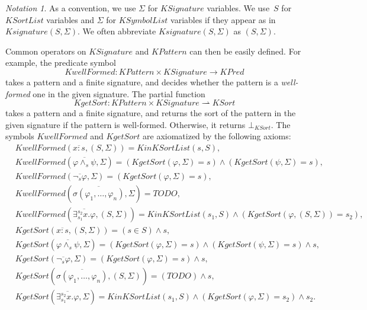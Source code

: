 \documentclass[UTF8,11pt]{article}
\newcounter{thmcounter}
\theoremstyle{plain}
\theoremstyle{definition}
\theoremstyle{remark}
\newtheorem{notation}   [thmcounter]{Notation}
\newcommand{\cln}{{:}}
\newcommand{\KPred}{\mathit{KPred}}
\newcommand{\KSort}{\mathit{KSort}}
\newcommand{\KSortList}{\mathit{KSortList}}
\newcommand{\KinKSortList}{\mathit{KinKSortList}}
\newcommand{\KSymbolList}{\mathit{KSymbolList}}
\newcommand{\KPattern}{\mathit{KPattern}}
\newcommand{\KSignature}{\mathit{KSignature}}
\newcommand{\Ksignature}{\mathit{Ksignature}}
\newcommand{\KwellFormed}{\mathit{KwellFormed}}
\newcommand{\KgetSort}{\mathit{KgetSort}}
\begin{document}
\begin{notation}
	As a convention, we use $\Sigma$ for $\KSignature$ variables. 
	We use~$S$ for~$\KSortList$ variables and $\Sigma$ for $\KSymbolList$ variables if they appear as in~$\Ksignature(S, \Sigma)$.
	We often abbreviate $\Ksignature(S, \Sigma)$ as $( S, \Sigma )$. 
\end{notation}

Common operators on $\KSignature$ and $\KPattern$ can then be easily defined.
For example, the predicate symbol 
$$\KwellFormed \colon \KPattern \times \KSignature \to \KPred$$ 
takes a pattern and a finite signature, and decides whether the pattern is a \emph{well-formed} one in the given signature.
The partial function
$$\KgetSort \colon \KPattern \times \KSignature \rightharpoonup \KSort$$
takes a pattern and a finite signature, and returns the sort of the pattern in the given signature if the pattern is well-formed.
Otherwise, it returns $\bot_\KSort$.
The symbols $\KwellFormed$ and $\KgetSort$ are axiomatized by the following axioms:
\begin{align*}
  &\KwellFormed(\overline{x \cln s}, ( S, \Sigma )) = \KinKSortList(s, S),
  \\
  & \KwellFormed(\overline{\varphi \wedge_s \psi}, \Sigma) = (\KgetSort(\varphi, \Sigma) = s) \wedge (\KgetSort(\psi, \Sigma) = s),
  \\
  & \KwellFormed(\overline{\neg_s \varphi}, \Sigma) = (\KgetSort(\varphi, \Sigma) = s),
  \\
  & \KwellFormed(\overline{\sigma(\varphi_1, \dots, \varphi_n)}, \Sigma) = TODO,
  \\
  & \KwellFormed(\overline{\exists_{s_1}^{s_2} x . \varphi}, ( S, \Sigma )) = \KinKSortList(s_1, S) \wedge (\KgetSort(\varphi, (S, \Sigma)) = s_2),
  \\
  & \KgetSort(\overline{x \cln s}, ( S, \Sigma )) = (s \in S) \wedge s,
  \\
  & \KgetSort(\overline{\varphi \wedge_s \psi}, \Sigma) = (\KgetSort(\varphi, \Sigma) = s) \wedge (\KgetSort(\psi, \Sigma) = s) \wedge s,
  \\
  & \KgetSort(\overline{\neg_s \varphi}, \Sigma) = (\KgetSort(\varphi, \Sigma) = s) \wedge s,
  \\
  & \KgetSort(\overline{\sigma(\varphi_1,\dots,\varphi_n)}, ( S, \Sigma )) = (TODO) \wedge s,
  \\
  & \KgetSort(\overline{\exists_{s_1}^{s_2} x . \varphi}, \Sigma) = \KinKSortList(s_1, S) \wedge (\KgetSort(\varphi, \Sigma) = s_2) \wedge s_2.
\end{align*}
\end{document}
